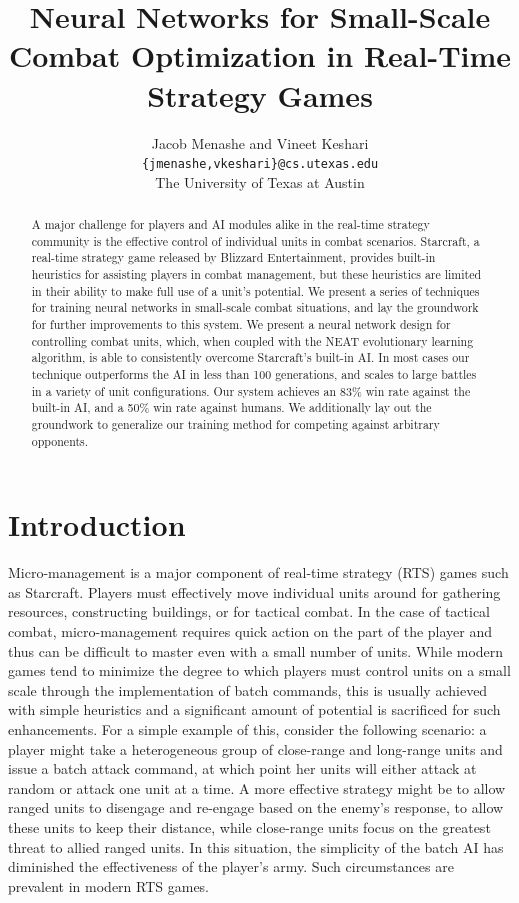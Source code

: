 \documentclass[10pt,a4paper,twocolumn]{article}
\begin{document}
\title{Neural Networks for Small-Scale Combat Optimization in Real-Time Strategy Games}
\author{Jacob Menashe and Vineet Keshari \\ \texttt{\{jmenashe,vkeshari\}@cs.utexas.edu} \\ The University of Texas at Austin}
\maketitle

\begin{abstract}
A major challenge for players and AI modules alike in the real-time strategy community is the effective control of individual units in combat scenarios. Starcraft, a real-time strategy game released by Blizzard Entertainment, provides built-in heuristics for assisting players in combat management, but these heuristics are limited in their ability to make full use of a unit's potential. We present a series of techniques for training neural networks in small-scale combat situations, and lay the groundwork for further improvements to this system. We present a neural network design for controlling combat units, which, when coupled with the NEAT evolutionary learning algorithm, is able to consistently overcome Starcraft's built-in AI. In most cases our technique outperforms the AI in less than 100 generations, and scales to large battles in a variety of unit configurations. Our system achieves an 83\% win rate against the built-in AI, and a 50\% win rate against humans. We additionally lay out the groundwork to generalize our training method for competing against arbitrary opponents.
\end{abstract}

\section{Introduction}

Micro-management is a major component of real-time strategy (RTS) games such as Starcraft. Players must effectively move individual units around for gathering resources, constructing buildings, or for tactical combat. In the case of tactical combat, micro-management requires quick action on the part of the player and thus can be difficult to master even with a small number of units. While modern games tend to minimize the degree to which players must control units on a small scale through the implementation of batch commands, this is usually achieved with simple heuristics and a significant amount of potential is sacrificed for such enhancements. For a simple example of this, consider the following scenario: a player might take a heterogeneous group of close-range and long-range units and issue a batch attack command, at which point her units will either attack at random or attack one unit at a time. A more effective strategy might be to allow ranged units to disengage and re-engage based on the enemy's response, to allow these units to keep their distance, while close-range units focus on the greatest threat to allied ranged units. In this situation, the simplicity of the batch AI has diminished the effectiveness of the player's army. Such circumstances are prevalent in modern RTS games.
\end{document}
